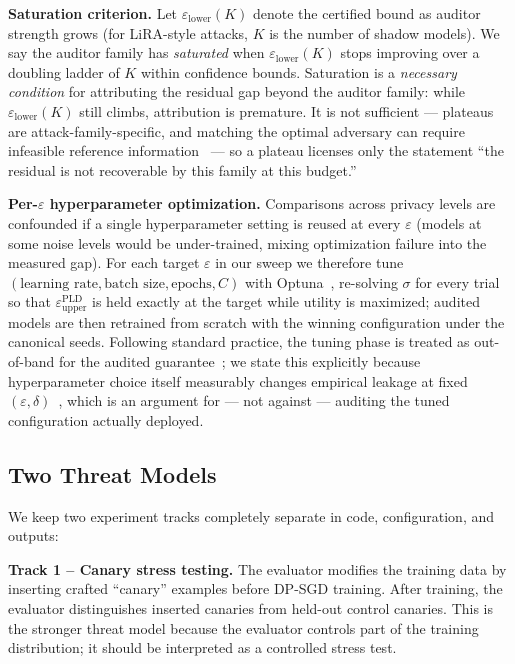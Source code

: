 \documentclass{article}
\begin{document}
\textbf{Saturation criterion.} Let $\varepsilon_{\text{lower}}(K)$ denote the certified bound as auditor strength grows (for LiRA-style attacks, $K$ is the number of shadow models). We say the auditor family has \emph{saturated} when $\varepsilon_{\text{lower}}(K)$ stops improving over a doubling ladder of $K$ within confidence bounds. Saturation is a \emph{necessary condition} for attributing the residual gap beyond the auditor family: while $\varepsilon_{\text{lower}}(K)$ still climbs, attribution is premature. It is not sufficient --- plateaus are attack-family-specific, and matching the optimal adversary can require infeasible reference information~\citep{haghifam2025sample, keinan2025onerun} --- so a plateau licenses only the statement ``the residual is not recoverable by this family at this budget.''

\textbf{Per-$\varepsilon$ hyperparameter optimization.} Comparisons across privacy levels are confounded if a single hyperparameter setting is reused at every $\varepsilon$ (models at some noise levels would be under-trained, mixing optimization failure into the measured gap). For each target $\varepsilon$ in our sweep we therefore tune $(\text{learning rate}, \text{batch size}, \text{epochs}, C)$ with Optuna~\citep{akiba2019optuna}, re-solving $\sigma$ for every trial so that $\varepsilon^{\text{PLD}}_{\text{upper}}$ is held exactly at the target while utility is maximized; audited models are then retrained from scratch with the winning configuration under the canonical seeds. Following standard practice, the tuning phase is treated as out-of-band for the audited guarantee~\citep{papernot2022hyperparameter}; we state this explicitly because hyperparameter choice itself measurably changes empirical leakage at fixed $(\varepsilon,\delta)$~\citep{hu2025empirical}, which is an argument for --- not against --- auditing the tuned configuration actually deployed.

\subsection{Two Threat Models}

We keep two experiment tracks completely separate in code, configuration, and outputs:

\textbf{Track 1 -- Canary stress testing.} The evaluator modifies the training data by inserting crafted ``canary'' examples before DP-SGD training. After training, the evaluator distinguishes inserted canaries from held-out control canaries. This is the stronger threat model because the evaluator controls part of the training distribution; it should be interpreted as a controlled stress test.
\end{document}
